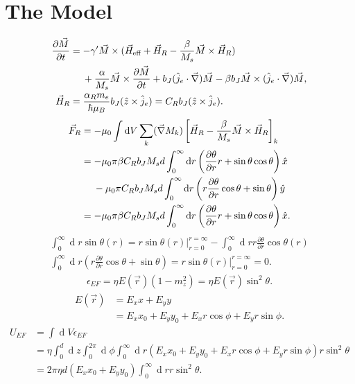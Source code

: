 \documentclass[12pt, a4paper, twoside, openright]{article}		%
\let\oldsection\section
\def\section{\cleardoublepage\oldsection}
\renewcommand{\d}[1]{\ensuremath{\operatorname{d}\!{#1}}}
\numberwithin{equation}{section}
\begin{document}
\section{The Model}
\begin{align}
\nonumber \frac{\partial \vec{M}}{\partial t} &= -\gamma'\vec{M}\times(\vec{H}_{\text{eff}}+\vec{H}_R-\frac{\beta}{M_s} \vec{M}\times\vec{H}_R) \\
&\hspace{4.5mm}+\frac{\alpha}{M_s}\vec{M}\times\frac{\partial\vec{M}}{\partial t} + b_J (\hat{j}_e\cdot\vec{\nabla})\vec{M} - \beta b_J \vec{M}\times(\hat{j}_e\cdot\vec{\nabla})\vec{M}, \\
\vec{H}_R &= \frac{\alpha_R m_e}{\hbar \mu_B}b_J (\hat{z}\times\hat{j}_e) = C_R b_J (\hat{z}\times\hat{j}_e).
\end{align}
\begin{align}
\vec{F}_R &= -\mu_0\int \d V\sum_k (\vec{\nabla}M_k)\left[\vec{H}_R - \frac{\beta}{M_s}\vec{M}\times\vec{H}_R\right]_k \\
&= -\mu_0 \pi\beta C_R b_J M_s d \int_0^{\infty} \d r \left(\frac{\partial \theta}{\partial r} r + \sin\theta\cos\theta \right) \hat{x} \\
&\hspace{4.5mm}- \mu_0 \pi C_R b_J M_s d \int_0^{\infty} \d r \left(r\frac{\partial \theta}{\partial r}\cos\theta + \sin\theta\right) \hat{y} \\
&= -\mu_0 \pi\beta C_R b_J M_s d \int_0^{\infty} \d r \left(\frac{\partial \theta}{\partial r} r + \sin\theta\cos\theta \right) \hat{x}.
\end{align}
\begin{align}
\int_0^{\infty} \d r \sin\theta(r) = r\sin\theta(r)|_{r = 0}^{r=\infty} - \int_0^{\infty} \d r r \frac{\partial \theta}{\partial r} \cos\theta(r) \\
\int_0^{\infty} \d r \left(r\frac{\partial \theta}{\partial r}\cos\theta + \sin\theta\right) = r\sin\theta(r)|_{r = 0}^{r=\infty} = 0.
\end{align}
\begin{align}
\epsilon_{EF} = \eta E(\vec{r}) \left(1-m_z^2\right) = \eta E(\vec{r}) \sin^2\theta.
\end{align}
\begin{align}
E(\vec{r}) &= E_x x + E_y y \\
&= E_x x_0 + E_y y_0 + E_x r \cos\phi + E_y r \sin\phi.
\end{align}
\begin{align}
U_{EF} &= \int \d V \epsilon_{EF} \\
&= \eta \int_0^d \d z \int_0^{2\pi}\d \phi \int_0^{\infty}\d r\left( E_x x_0 + E_y y_0 + E_x r \cos\phi + E_y r \sin\phi \right) r \sin^2\theta \\
&= 2\pi\eta d\left(E_x x_0 + E_y y_0\right)\int_0^{\infty}\d r r \sin^2\theta.
\end{align}
\end{document}
